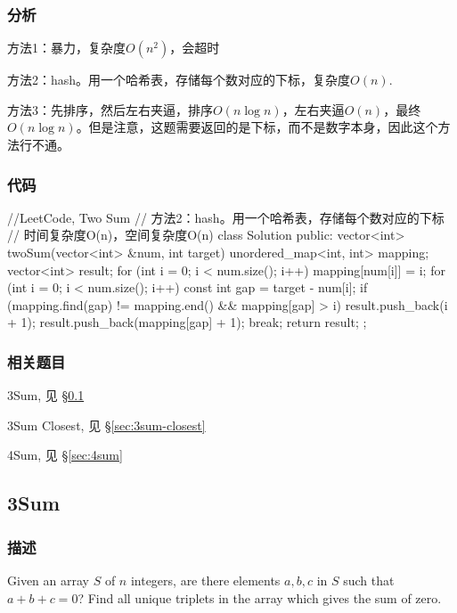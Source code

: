 \subsubsection{分析}
方法1：暴力，复杂度$O(n^2)$，会超时

方法2：hash。用一个哈希表，存储每个数对应的下标，复杂度$O(n)$.

方法3：先排序，然后左右夹逼，排序$O(n\log n)$，左右夹逼$O(n)$，最终$O(n\log n)$。但是注意，这题需要返回的是下标，而不是数字本身，因此这个方法行不通。


\subsubsection{代码}
\begin{Code}
//LeetCode, Two Sum
// 方法2：hash。用一个哈希表，存储每个数对应的下标
// 时间复杂度O(n)，空间复杂度O(n)
class Solution {
public:
    vector<int> twoSum(vector<int> &num, int target) {
        unordered_map<int, int> mapping;
        vector<int> result;
        for (int i = 0; i < num.size(); i++) {
            mapping[num[i]] = i;
        }
        for (int i = 0; i < num.size(); i++) {
            const int gap = target - num[i];
            if (mapping.find(gap) != mapping.end() && mapping[gap] > i) {
                result.push_back(i + 1);
                result.push_back(mapping[gap] + 1);
                break;
            }
        }
        return result;
    }
};
\end{Code}


\subsubsection{相关题目}
\begindot
\item 3Sum, 见 \S \ref{sec:3sum}
\item 3Sum Closest, 见 \S \ref{sec:3sum-closest}
\item 4Sum, 见 \S \ref{sec:4sum}
\myenddot


\subsection{3Sum} %
\label{sec:3sum}


\subsubsection{描述}
Given an array $S$ of $n$ integers, are there elements $a, b, c$ in $S$ such that $a + b + c = 0$? Find all unique triplets in the array which gives the sum of zero.

